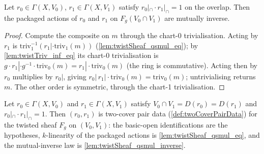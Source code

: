 \begin{lemma}
  \label{lem:twistSheaf_qsmul_inverse}
  \leanok
  Let \(r_0 \in \Gamma(X, V_0)\), \(r_1 \in \Gamma(X, V_1)\) satisfy
  \(r_0|_{\cap} \cdot r_1|_{\cap} = 1\) on the overlap. Then the packaged actions of
  \(r_0\) and \(r_1\) on \(F_g(V_0 \cap V_1)\) are mutually inverse.
\end{lemma}
\begin{proof}
  \leanok
  Compute the composite on \(m\) through the chart-0 trivialisation. Acting by \(r_1\)
  is \(\mathrm{triv}_1^{-1}(r_1| \cdot \mathrm{triv}_1(m))\)
  (\ref{lem:twistSheaf_qsmul_eq}); by \ref{lem:twistTriv_inf_eq} its chart-0
  trivialisation is \(g \cdot r_1| \cdot g^{-1} \cdot \mathrm{triv}_0(m)
  = r_1| \cdot \mathrm{triv}_0(m)\) (the ring is commutative). Acting then by \(r_0\)
  multiplies by \(r_0|\), giving \(r_0|\, r_1| \cdot \mathrm{triv}_0(m) =
  \mathrm{triv}_0(m)\); untrivialising returns \(m\). The other order is symmetric,
  through the chart-1 trivialisation.
\end{proof}

\begin{definition}
  \label{def:twistPairData}
  \leanok
  Let \(r_0 \in \Gamma(X, V_0)\) and \(r_1 \in \Gamma(X, V_1)\) satisfy
  \(V_0 \cap V_1 = D(r_0) = D(r_1)\) and \(r_0|_{\cap} \cdot r_1|_{\cap} = 1\). Then
  \((r_0, r_1)\) is two-cover pair data (\ref{def:twoCoverPairData}) for the twisted
  sheaf \(F_g\) on \((V_0, V_1)\): the basic-open identifications are the hypotheses,
  \(k\)-linearity of the packaged actions is \ref{lem:twistSheaf_qsmul_eq}, and the
  mutual-inverse law is \ref{lem:twistSheaf_qsmul_inverse}.
\end{definition}

